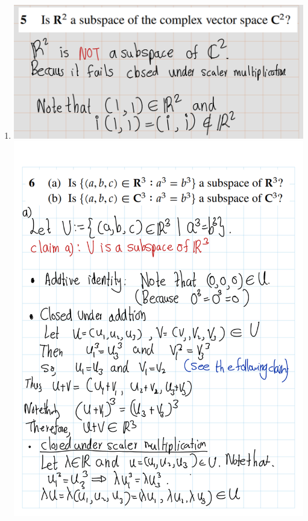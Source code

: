\documentclass[
]{book}
\theoremstyle{definition}
\theoremstyle{definition}
\theoremstyle{definition}
\theoremstyle{definition}
\theoremstyle{remark}
\begin{document}
\begin{enumerate}
\item
  \hfill\break
  \includegraphics{fig/Ex1C/Ex5.png}
  \includegraphics{fig/Ex1C/Ex/Ex-01.png}

\end{enumerate}
\end{document}
